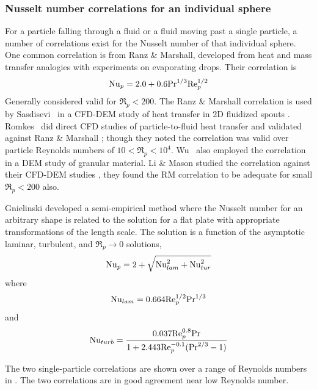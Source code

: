 \subsubsection{Nusselt number correlations for an individual sphere}
For a particle falling through a fluid or a fluid moving past a single particle, a number of correlations exist for the Nusselt number of that individual sphere. One common correlation is from Ranz \& Marshall\cite{Ranz1952}, developed from heat and mass transfer analogies with experiments on evaporating drops. Their correlation is
\begin{equation}\label{eq:ranz_marshall}
    \mathrm{Nu}_p = 2.0 + 0.6\mathrm{Pr}^{1/3}\mathrm{Re}_p^{1/2}
\end{equation}
Generally considered valid for $\Re_p< 200$. The Ranz \& Marshall correlation is used by Sasdisevi\etal~ in a CFD-DEM study of heat transfer in 2D fluidized spouts \cite{Swasdisevi2005}. Romkes\etal~ did direct CFD studies of particle-to-fluid heat transfer and validated against Ranz \& Marshall \cite{Romkes2003}; though they noted the correlation was valid over particle Reynolds numbers of $10 < \Re_p < 10^4$. Wu\etal~ also employed the correlation in a DEM study of granular material\cite{Wu2011}. Li \& Mason studied the correlation against their CFD-DEM studies \cite{Li2003a}, they found the RM correlation to be adequate for small $\Re_p < 200$ also. 



Gnielinski\cite{gnielinski1982berechnung} developed a semi-empirical method where the Nusselt number for an arbitrary shape is related to the solution for a flat plate with appropriate transformations of the length scale. The solution is a function of the asymptotic laminar, turbulent, and $\Re_p\rightarrow 0$ solutions,
\begin{equation}\label{eq:gnielinski}
    \mathrm{Nu}_p = 2 + \sqrt{\mathrm{Nu}^2_{lam} + \mathrm{Nu}^2_{tur}}
\end{equation}
where
\begin{equation}
    \mathrm{Nu}_{lam} = 0.664\mathrm{Re}_p^{1/2}\mathrm{Pr}^{1/3}
\end{equation}
and
\begin{equation}
    \mathrm{Nu}_{turb} = \frac{0.037 \mathrm{Re}_p^{0.8}\mathrm{Pr}}{1 + 2.443\mathrm{Re}_p^{-0.1}(\mathrm{Pr}^{2/3}-1)}
\end{equation}


The two single-particle correlations are shown over a range of Reynolds numbers in . The two correlations are in good agreement near low Reynolds number.

